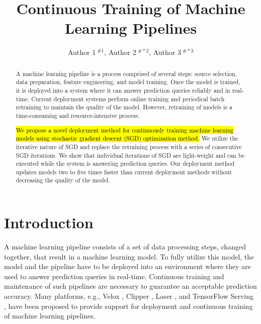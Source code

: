 \documentclass[10pt,conference,letterpaper]{IEEEtran}
\title{Continuous Training of Machine Learning Pipelines}
\author{
{Author 1{\small $~^{\# 1}$}, Author 2{\small $~^{\# *2}$}, Author 3{\small $~^{\# *3}$} }}
\begin{document}
\maketitle
\begin{abstract}
A machine learning pipeline is a process comprised of several steps: source selection, data preparation, feature engineering, and model training. 
Once the model is trained, it is deployed into a system where it can answer prediction queries reliably and in real-time.
Current deployment systems perform online training and periodical batch retraining to maintain the quality of the model.
However, retraining of models is a time-consuming and resource-intensive process.

\hl{We propose a novel deployment method for continuously training machine learning models using stochastic gradient descent (SGD) optimization method.}
We utilize the iterative nature of SGD and replace the retraining process with a series of consecutive SGD iterations.
We show that individual iterations of SGD are light-weight and can be executed while the system is answering prediction queries.
Our deployment method updates models two to five times faster than current deployment methods without decreasing the quality of the model.
\end{abstract}


\section{Introduction} \label{introduction}
A machine learning pipeline consists of a set of data processing steps, changed together, that result in a machine learning model.
To fully utilize this model,  the model and the pipeline have to be deployed into an environment where they are used to answer prediction queries in real-time.
Continuous training and maintenance of such pipelines are necessary to guarantee an acceptable prediction accuracy.
Many platforms, e.g., Velox \cite{crankshaw2014missing}, Clipper \cite{crankshaw2016clipper}, Laser \cite{agarwal2014laser}, and TensorFlow Serving \cite{abadi2016tensorflow}, have been proposed to provide support for deployment and continuous training of machine learning pipelines. 
\end{document}

